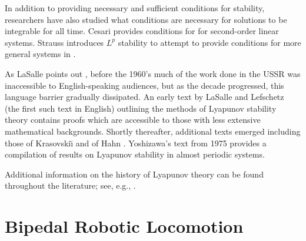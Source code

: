 In addition to providing necessary and sufficient conditions for stability,
researchers have also studied what conditions are necessary for solutions to be
integrable for all time.
%
Cesari provides conditions for \cite[\S 1.5]{Cesari1971} for second-order linear
systems.
%
Strauss introduces $L^{p}$ stability to attempt to provide conditions for more
general systems in \cite{Strauss1965}.

As LaSalle points out \cite{LaSalle1964}, before the 1960's much of the work
done in the USSR was inaccessible to English-speaking audiences, but as the
decade progressed, this language barrier gradually dissipated.
%
An early text by LaSalle and Lefschetz (the first such text in English)
\cite{LaSalle1961} outlining the methods of Lyapunov stability theory contains
proofs which are accessible to those with less extensive mathematical
backgrounds.
%
Shortly thereafter, additional texts emerged including those of Krasovski\u{\i}
\cite{Krasovskii1963} and of Hahn \cite{Hahn1967}.
%
Yoshizawa's text from 1975 \cite{Yoshizawa1975} provides a compilation of
results on Lyapunov stability in almost periodic systems.

Additional information on the history of Lyapunov theory can be found throughout
the literature; see, e.g., \cite{Michel2007,Teel1999}.
%

\section{Bipedal Robotic Locomotion}









